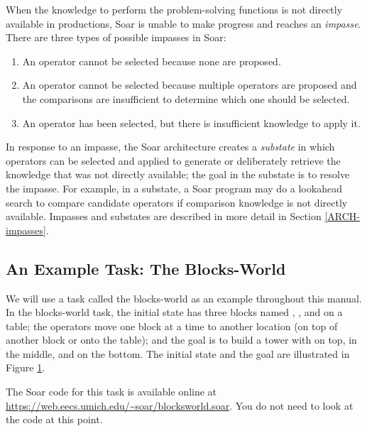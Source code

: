When the knowledge to perform the problem-solving functions is not
directly available in productions, Soar is unable to make progress and
reaches an \textit{impasse}.  There are three types of possible impasses
in Soar:
\begin{enumerate}
\item An operator cannot be selected because none are proposed.\vspace{-4pt}
\item An operator cannot be selected because multiple operators are
        proposed and the comparisons are insufficient to determine which
        one should be selected.\vspace{-4pt}
\item An operator has been selected, but there is insufficient knowledge
        to apply it.\vspace{-4pt}
\end{enumerate}
In response to an impasse, the Soar architecture creates a
\textit{substate} in which operators can be selected and applied to
generate or deliberately retrieve the knowledge that was not directly
available; the goal in the substate is to resolve the impasse. For
example, in a substate, a Soar program may do a lookahead search to
compare candidate operators if comparison knowledge is not directly
available.  Impasses and substates are described in more detail in
Section \ref{ARCH-impasses}.


\subsection{An Example Task: The Blocks-World}

We will use a task called the blocks-world as an example throughout this
manual. In the blocks-world task, the initial state has three blocks named
, , and  on a table; the operators move one block at a
time to another location (on top of another block or onto the table); and the
goal is to build a tower with  on top,  in the middle, and
 on the bottom. The initial state and the goal are illustrated in
Figure \ref{fig:blocks}.

The Soar code for this task is available online at  \url{https://web.eecs.umich.edu/~soar/blocksworld.soar}. You do not
need to look at the code at this point.

\begin{figure}
\label{fig:blocks}
\end{figure}

